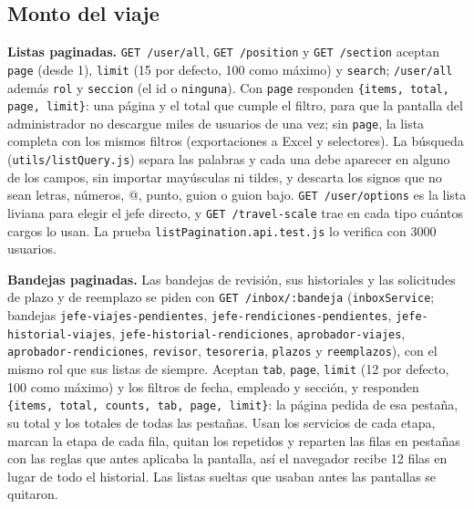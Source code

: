 \documentclass[11pt,letterpaper]{article}
\newcommand{\code}[1]{\nolinkurl{#1}}
\begin{document}
\subsection{Monto del viaje}
\textbf{Listas paginadas.} \code{GET /user/all}, \code{GET /position} y \code{GET /section} aceptan \code{page} (desde 1), \code{limit} (15 por defecto, 100 como máximo) y \code{search}; \code{/user/all} además \code{rol} y \code{seccion} (el id o \code{ninguna}). Con \code{page} responden \code{\{items, total, page, limit\}}: una página y el total que cumple el filtro, para que la pantalla del administrador no descargue miles de usuarios de una vez; sin \code{page}, la lista completa con los mismos filtros (exportaciones a Excel y selectores). La búsqueda (\code{utils/listQuery.js}) separa las palabras y cada una debe aparecer en alguno de los campos, sin importar mayúsculas ni tildes, y descarta los signos que no sean letras, números, @, punto, guion o guion bajo. \code{GET /user/options} es la lista liviana para elegir el jefe directo, y \code{GET /travel-scale} trae en cada tipo cuántos cargos lo usan. La prueba \code{listPagination.api.test.js} lo verifica con 3000 usuarios.

\textbf{Bandejas paginadas.} Las bandejas de revisión, sus historiales y las solicitudes de plazo y de reemplazo se piden con \code{GET /inbox/:bandeja} (\code{inboxService}; bandejas \code{jefe-viajes-pendientes}, \code{jefe-rendiciones-pendientes}, \code{jefe-historial-viajes}, \code{jefe-historial-rendiciones}, \code{aprobador-viajes}, \code{aprobador-rendiciones}, \code{revisor}, \code{tesoreria}, \code{plazos} y \code{reemplazos}), con el mismo rol que sus listas de siempre. Aceptan \code{tab}, \code{page}, \code{limit} (12 por defecto, 100 como máximo) y los filtros de fecha, empleado y sección, y responden \code{\{items, total, counts, tab, page, limit\}}: la página pedida de esa pestaña, su total y los totales de todas las pestañas. Usan los servicios de cada etapa, marcan la etapa de cada fila, quitan los repetidos y reparten las filas en pestañas con las reglas que antes aplicaba la pantalla, así el navegador recibe 12 filas en lugar de todo el historial. Las listas sueltas que usaban antes las pantallas se quitaron.
\end{document}
